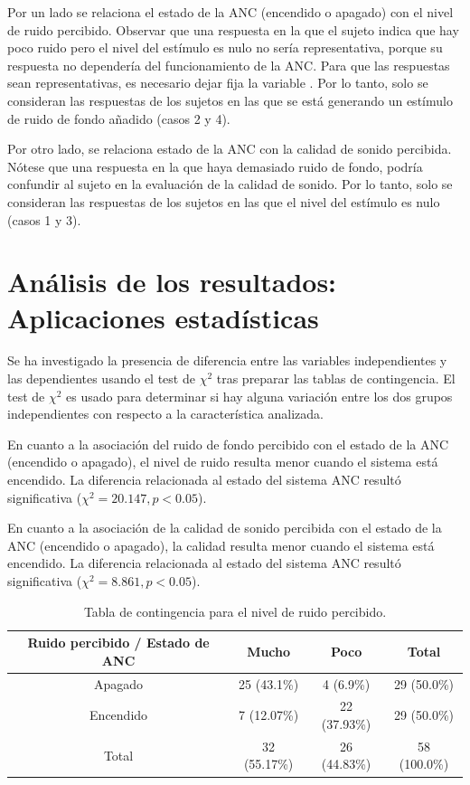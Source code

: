 \documentclass[a4paper,12pt]{article}
\begin{document}
Por un lado se relaciona el estado de la ANC (encendido o apagado) con el nivel de ruido percibido.
Observar que una respuesta en la que el sujeto indica que hay poco ruido pero el nivel del estímulo es nulo no sería representativa, porque su respuesta no dependería del funcionamiento de la ANC.
Para que las respuestas sean representativas, es necesario dejar fija la variable .
Por lo tanto, solo se consideran las respuestas de los sujetos en las que se está generando un estímulo de ruido de fondo añadido (casos 2 y 4).

Por otro lado, se relaciona estado de la ANC con la calidad de sonido percibida.
Nótese que una respuesta en la que haya demasiado ruido de fondo, podría confundir al sujeto en la evaluación de la calidad de sonido.
Por lo tanto, solo se consideran las respuestas de los sujetos en las que el nivel del estímulo es nulo (casos 1 y 3).

\section{Análisis de los resultados: Aplicaciones estadísticas}
\label{sec:results}

Se ha investigado la presencia de diferencia entre las variables independientes y las dependientes usando el test de $\chi^2$ tras preparar las tablas de contingencia.
El test de $\chi^2$ es usado para determinar si hay alguna variación entre los dos grupos independientes con respecto a la característica analizada.

En cuanto a la asociación del ruido de fondo percibido con el estado de la ANC (encendido o apagado), el nivel de ruido resulta menor cuando el sistema está encendido.
La diferencia relacionada al estado del sistema ANC resultó significativa ($\chi^2 = 20.147, p < 0.05$).

En cuanto a la asociación de la calidad de sonido percibida con el estado de la ANC (encendido o apagado), la calidad resulta menor cuando el sistema está encendido.
La diferencia relacionada al estado del sistema ANC resultó significativa ($\chi^2 = 8.861, p < 0.05$).

\begin{table}[ht]
    \centering
    \begin{tabular}{|c|c|c|c|}
        \hline
        \textbf{Ruido percibido / Estado de ANC} & \textbf{Mucho} & \textbf{Poco} & \textbf{Total} \\
        \hline
        Apagado & 25 (43.1\%) & 4 (6.9\%) & 29 (50.0\%) \\
        \hline
        Encendido & 7 (12.07\%) & 22 (37.93\%) & 29 (50.0\%) \\
        \hline
        Total & 32 (55.17\%) & 26 (44.83\%) & 58 (100.0\%) \\
        \hline
\end{tabular}
\caption{Tabla de contingencia para el nivel de ruido percibido.}
\label{tab:cross_Y1}
\end{table}
\end{document}
